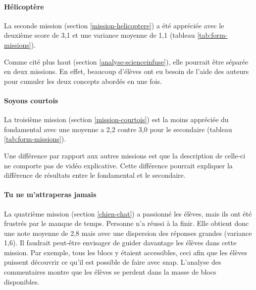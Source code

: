 \paragraph{Hélicoptère}
La seconde \gls{mission} (section \ref{mission-helicoptere}) a été appréciée avec le deuxième score de 3,1 et une variance moyenne de 1,1 (tableau \ref{tab:form-missions}).

Comme cité plus haut (section \ref{analyse-scienceinfuse}), elle pourrait être séparée en deux \glspl{mission}. En effet, beaucoup d'élèves ont eu besoin de l'aide des auteurs pour cumuler les deux concepts abordés en une fois.

\paragraph{Soyons courtois}
La troisième \gls{mission} (section \ref{mission-courtois}) est la moins appréciée du \gls{fondamental} avec une moyenne a 2,2 contre 3,0 pour le \gls{secondaire} (tableau \ref{tab:form-missions}).

Une différence par rapport aux autres \glspl{mission} est que la description de celle-ci ne comporte pas de vidéo explicative. Cette différence pourrait expliquer la différence de résultats entre le \gls{fondamental} et le \gls{secondaire}.

\paragraph{Tu ne m'attraperas jamais}
La quatrième \gls{mission} (section \ref{chien-chat}) a passionné les élèves, mais ils ont été frustrés par le manque de temps. Personne n'a réussi à la finir. Elle obtient donc une note moyenne de 2,8 mais avec une dispersion des réponses grandes (variance 1,6). Il faudrait peut-être envisager de guider davantage les élèves dans cette \gls{mission}. Par exemple, tous les \glspl{bloc} y étaient accessibles, ceci afin que les élèves puissent découvrir ce qu'il est possible de faire avec \gls{snap}. L'analyse des commentaires montre que les élèves se perdent dans la masse de \glspl{bloc} disponibles.

